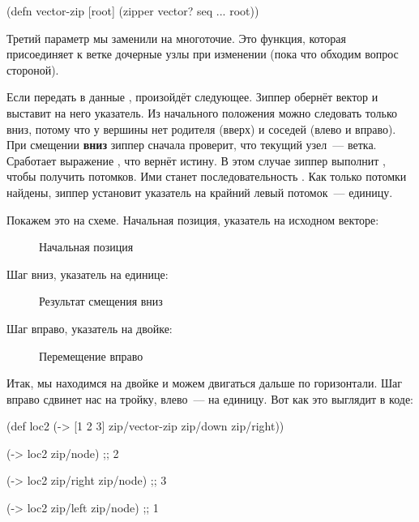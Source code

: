 \begin{english}
  \begin{clojure}
(defn vector-zip
  [root]
  (zipper vector?
          seq
          ...
          root))
  \end{clojure}
\end{english}

Третий параметр мы заменили на многоточие. Это функция, которая присоединяет к
ветке дочерные узлы при изменении (пока что обходим вопрос стороной).

Если передать в  данные \code{[1 2 3]}, произойдёт
следующее. Зиппер обернёт вектор и выставит на него указатель. Из начального
положения можно следовать только вниз, потому что у вершины нет родителя (вверх)
и соседей (влево и вправо). При смещении \textbf{вниз} зиппер сначала проверит,
что текущий узел~--- ветка. Сработает выражение , что
вернёт истину. В этом случае зиппер выполнит , чтобы
получить потомков. Ими станет последовательность . Как только
потомки найдены, зиппер установит указатель на крайний левый потомок~---
единицу.

Покажем это на схеме. Начальная позиция, указатель на исходном векторе:

\begin{figure}[ht!]
  \centering
  \caption{Начальная позиция}
  \label{fig:chart-zip-1}
\end{figure}

Шаг вниз, указатель на единице:

\begin{figure}[ht!]
  \centering
  \caption{Результат смещения вниз}
  \label{fig:chart-zip-2}
\end{figure}

Шаг вправо, указатель на двойке:

\begin{figure}[ht!]
  \centering
  \caption{Перемещение вправо}
  \label{fig:chart-zip-3}
\end{figure}

Итак, мы находимся на двойке и можем двигаться дальше по горизонтали. Шаг вправо
сдвинет нас на тройку, влево~--- на единицу. Вот как это выглядит в коде:

\begin{english}
  \begin{clojure}
(def loc2
  (-> [1 2 3]
      zip/vector-zip
      zip/down
      zip/right))

(-> loc2 zip/node)
;; 2

(-> loc2 zip/right zip/node)
;; 3

(-> loc2 zip/left zip/node)
;; 1
  \end{clojure}
\end{english}


